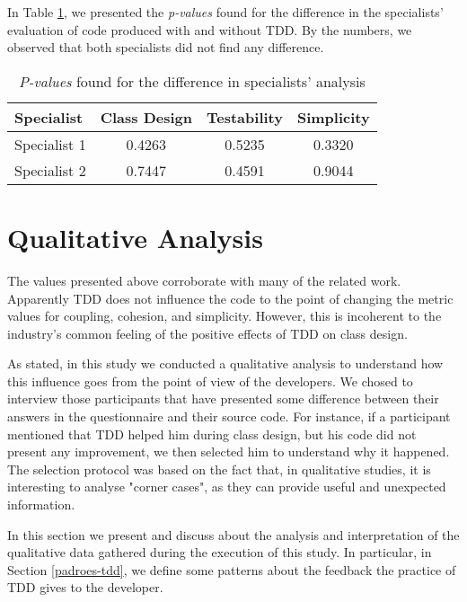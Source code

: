\documentclass[times]{elsarticle}
\begin{document}
In Table
\ref{tab:especialistas-industria}, we presented the \textit{p-values} found for the
difference in the specialists' evaluation of code produced with and without TDD.
By the numbers, we observed that both specialists did not find any difference.

\begin{table}[h!]
	\centering
	\begin{tabular}{| p{2cm} | c | c | c | }
		\hline
		\textbf{Specialist} & \textbf{Class Design} & \textbf{Testability} & \textbf{Simplicity}\\
		\hline
		Specialist 1 &	0.4263 &	0.5235 &	0.3320\\
		Specialist 2 &	0.7447 &	0.4591 &	0.9044\\
		\hline
	\end{tabular}
	\caption{\textit{P-values} found for the difference in specialists' analysis}
	\label{tab:especialistas-industria}
\end{table}


\section{Qualitative Analysis}
\label{sec:qualitative}

The values presented above corroborate with many of the related work.
Apparently TDD does not influence the code to the point of changing
the metric values for coupling, cohesion, and simplicity. However, this is
incoherent to the industry's common feeling of the positive effects of TDD on class design.

As stated, in this study we conducted a qualitative analysis to understand
how this influence goes from the point of view of the developers.
We chosed to interview those participants that have presented some difference between
their answers in the questionnaire and their source code. For instance, if a participant
mentioned that TDD helped him during class design, but his code did not present any improvement,
we then selected him to understand why it happened. The selection protocol was based on the fact that,
in qualitative studies, it is interesting to analyse "corner cases", as they can provide useful
and unexpected information.

In this section we present and discuss about the analysis and interpretation of
the qualitative data gathered during the execution of this study. In particular,
in Section \ref{padroes-tdd}, we define some patterns about the feedback the practice
of TDD gives to the developer.
\end{document}
